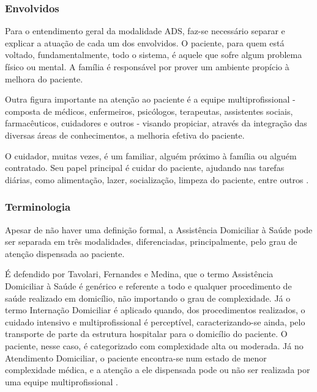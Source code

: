 \subsubsection{Envolvidos}\label{subsubsec:envolvidos}

Para o entendimento geral da modalidade ADS, faz-se necessário separar e
explicar a atuação de cada um dos envolvidos. O paciente, para quem está
voltado, fundamentalmente, todo o sistema, é aquele que sofre algum problema
físico ou mental. A família é responsável por prover um ambiente propício à
melhora do paciente.

Outra figura importante na atenção ao paciente é a equipe multiprofissional -
composta de médicos, enfermeiros, psicólogos, terapeutas, assistentes sociais,
farmacêuticos, cuidadores e outros - visando propiciar, através da integração
das diversas áreas de conhecimentos, a melhoria efetiva do paciente.

O cuidador, muitas vezes, é um familiar, alguém próximo à família ou alguém
contratado. Seu papel principal é cuidar do paciente, ajudando nas tarefas
diárias, como alimentação, lazer, socialização, limpeza do paciente, entre
outros \cite{amaral2001assistencia}.


\subsubsection{Terminologia}\label{subsubsec:terminologia}

Apesar de não haver uma definição formal, a Assistência Domiciliar à Saúde pode
ser separada em três modalidades, diferenciadas, principalmente, pelo grau de 
atenção dispensada ao paciente. 

É defendido por Tavolari, Fernandes e Medina, que o termo Assistência Domiciliar
à Saúde é genérico e referente a todo e qualquer procedimento de saúde realizado
em domicílio, não importando o grau de complexidade. Já o termo Internação
Domiciliar é aplicado quando, dos procedimentos realizados, o cuidado intensivo
e multiprofissional é perceptível, caracterizando-se ainda, pelo transporte de
parte da estrutura hospitalar para o domicílio do paciente. O paciente, nesse
caso, é categorizado com complexidade alta ou moderada.
Já no Atendimento Domiciliar, o paciente encontra-se num estado de menor 
complexidade médica, e a atenção a ele dispensada pode ou não ser realizada por
uma equipe multiprofissional \cite{tavolari2000desenvolvimento}.

